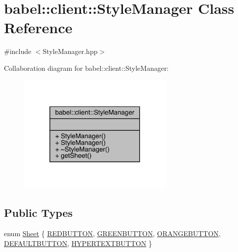 \hypertarget{classbabel_1_1client_1_1_style_manager}{}\section{babel\+:\+:client\+:\+:Style\+Manager Class Reference}
\label{classbabel_1_1client_1_1_style_manager}


{\ttfamily \#include $<$Style\+Manager.\+hpp$>$}



Collaboration diagram for babel\+:\+:client\+:\+:Style\+Manager\+:\nopagebreak
\begin{figure}[H]
\begin{center}
\leavevmode
\includegraphics[width=217pt]{classbabel_1_1client_1_1_style_manager__coll__graph}
\end{center}
\end{figure}
\subsection*{Public Types}
\begin{DoxyCompactItemize}
\item 
enum \mbox{\hyperlink{classbabel_1_1client_1_1_style_manager_a187dbf4a4f46c89dd5119496eb2fda52}{Sheet}} \{ \newline
\mbox{\hyperlink{classbabel_1_1client_1_1_style_manager_a187dbf4a4f46c89dd5119496eb2fda52ae1c465079aa32e42c4c2670bd67fa539}{R\+E\+D\+B\+U\+T\+T\+ON}}, 
\mbox{\hyperlink{classbabel_1_1client_1_1_style_manager_a187dbf4a4f46c89dd5119496eb2fda52a2768039bfbedb31cd7137508cc769e8e}{G\+R\+E\+E\+N\+B\+U\+T\+T\+ON}}, 
\mbox{\hyperlink{classbabel_1_1client_1_1_style_manager_a187dbf4a4f46c89dd5119496eb2fda52a4a9b4e1d919f16c8bdca4e25badd40e4}{O\+R\+A\+N\+G\+E\+B\+U\+T\+T\+ON}}, 
\mbox{\hyperlink{classbabel_1_1client_1_1_style_manager_a187dbf4a4f46c89dd5119496eb2fda52a50ef2ccbd7c310cf47c866ce829d1435}{D\+E\+F\+A\+U\+L\+T\+B\+U\+T\+T\+ON}}, 
\newline
\mbox{\hyperlink{classbabel_1_1client_1_1_style_manager_a187dbf4a4f46c89dd5119496eb2fda52afa7e020bff55c32dd881484eb7638f7f}{H\+Y\+P\+E\+R\+T\+E\+X\+T\+B\+U\+T\+T\+ON}}
 \}
\end{DoxyCompactItemize}
